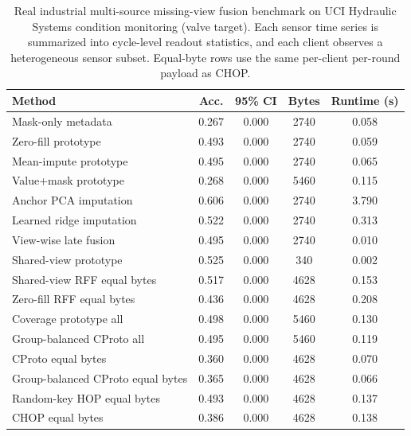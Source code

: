 \begin{table}[t]
\centering
\caption{Real industrial multi-source missing-view fusion benchmark on UCI Hydraulic Systems condition monitoring (valve target). Each sensor time series is summarized into cycle-level readout statistics, and each client observes a heterogeneous sensor subset. Equal-byte rows use the same per-client per-round payload as CHOP.}
\label{tab:if-hydraulic-fusion}
\scriptsize
\setlength{\tabcolsep}{3pt}
\renewcommand{\arraystretch}{0.94}
\begin{tabular}{lcccc}
\toprule
Method & Acc. & 95\% CI & Bytes & Runtime (s) \\
\midrule
Mask-only metadata & 0.267 & 0.000 & 2740 & 0.058 \\
Zero-fill prototype & 0.493 & 0.000 & 2740 & 0.059 \\
Mean-impute prototype & 0.495 & 0.000 & 2740 & 0.065 \\
Value+mask prototype & 0.268 & 0.000 & 5460 & 0.115 \\
Anchor PCA imputation & 0.606 & 0.000 & 2740 & 3.790 \\
Learned ridge imputation & 0.522 & 0.000 & 2740 & 0.313 \\
View-wise late fusion & 0.495 & 0.000 & 2740 & 0.010 \\
Shared-view prototype & 0.525 & 0.000 & 340 & 0.002 \\
Shared-view RFF equal bytes & 0.517 & 0.000 & 4628 & 0.153 \\
Zero-fill RFF equal bytes & 0.436 & 0.000 & 4628 & 0.208 \\
Coverage prototype all & 0.498 & 0.000 & 5460 & 0.130 \\
Group-balanced CProto all & 0.495 & 0.000 & 5460 & 0.119 \\
CProto equal bytes & 0.360 & 0.000 & 4628 & 0.070 \\
Group-balanced CProto equal bytes & 0.365 & 0.000 & 4628 & 0.066 \\
Random-key HOP equal bytes & 0.493 & 0.000 & 4628 & 0.137 \\
CHOP equal bytes & 0.386 & 0.000 & 4628 & 0.138 \\
\bottomrule
\end{tabular}
\end{table}
